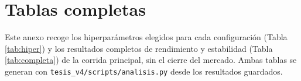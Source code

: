 \chapter{Tablas completas}\label{anx:tablas}

Este anexo recoge los hiperparámetros elegidos para cada configuración (Tabla
\ref{tab:hiper}) y los resultados completos de rendimiento y estabilidad (Tabla
\ref{tab:completa}) de la corrida principal, sin el cierre del mercado. Ambas tablas se generan
con \texttt{tesis\_v4/scripts/analisis.py} desde los resultados guardados.

{\small
\setlength{\tabcolsep}{4pt}

}

{\small
\setlength{\tabcolsep}{3pt}

}
